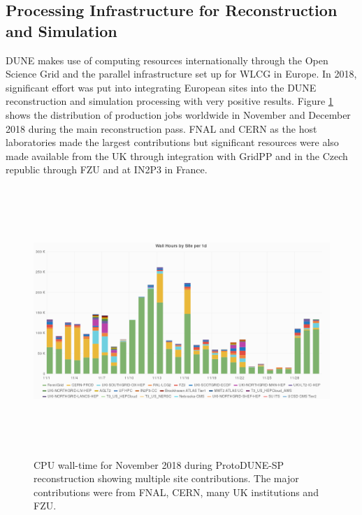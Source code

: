   \subsection{Processing Infrastructure for Reconstruction and Simulation}
  \label{ch-comp-processing}
  DUNE makes use of computing resources internationally through the Open Science Grid and the parallel infrastructure set up for WLCG in Europe.  In 2018, significant effort was put into integrating European sites into the DUNE reconstruction and simulation processing with very positive results.
  Figure \ref{fig:ch-exec-comp-cpupie} shows the distribution of production jobs worldwide in November and December 2018 during the main reconstruction pass.  FNAL and CERN as the host laboratories made the largest contributions but significant resources were also made available from the UK through integration with GridPP and in the Czech republic through FZU and at IN2P3 in France.

  \begin{figure}[htp]
    \centering
    \includegraphics[height=4in]{graphics/comp-vo-summary.png}
    \caption{CPU wall-time for November 2018 during ProtoDUNE-SP reconstruction showing multiple site contributions.  The major contributions were from FNAL, CERN, many UK institutions and FZU.}
    \label{fig:ch-exec-comp-cpupie}
  \end{figure}

